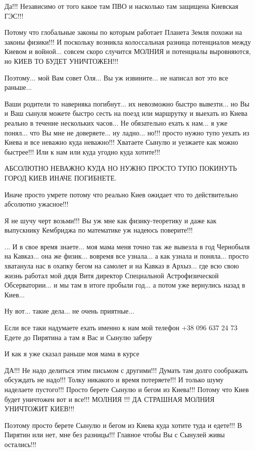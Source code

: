 Да!!! Независимо от того какое там ПВО и насколько там защищена Киевская ГЭС!!!

Потому что глобальные законы по которым работает Планета Земля похожи на законы физики!!!
И поскольку возникла колоссальная разница потенциалов между Киевом и войной... совсем скоро
случится МОЛНИЯ и потенциалы выровняются, но КИЕВ ТО БУДЕТ УНИЧТОЖЕН!!!

Поэтому... мой Вам совет Оля... Вы уж извините... не написал вот это все раньше...

Ваши родители то наверняка погибнут... их невозможно быстро вывезти... но Вы и Ваш сынуля
можете быстро сесть на поезд или маршрутку и выехать из Киева реально в течение нескольких часов...
Не обязательно ехать к нам... я уже понял... что Вы мне не доверяете... ну ладно...
но!!! просто нужно тупо уехать из Киева и все неважно куда неважно!!! Хватаете Сынулю и уезжаете как можно быстрее!!! 
Или к нам или куда угодно куда хотите!!!

АБСОЛЮТНО НЕВАЖНО КУДА НО НУЖНО ПРОСТО ТУПО ПОКИНУТЬ ГОРОД КИЕВ ИНАЧЕ ПОГИБНЕТЕ.

Иначе просто умрете потому что реально Киев ожидает что то действительно абсолютно ужасное!!! 

Я не шучу черт возьми!!! Вы уж мне как физику-теоретику и даже как выпускнику
Кембриджа по математике уж надеюсь поверите!!!

... И в свое время знаете... моя мама меня точно так же вывезла в год Чернобыля
на Кавказ... она же физик... вовремя все узнала... а как узнала и поняла... просто хватанула
нас в охапку бегом на самолет и на Кавказ в Архыз... где всю свою жизнь работал мой дядя Витя
директор Специальной Астрофизической Обсерватории... и мы там в итоге пробыли год... а потом уже 
вернулись назад в Киев...

Ну вот... такие дела... не очень приятные...

Если все таки надумаете ехать именно к нам мой телефон +38 096 637 24 73
Едете до Пирятина а там я Вас и Сынулю заберу

И как я уже сказал раньше моя мама в курсе 

ДА!!! Не надо делиться этим письмом с другими!!! Думать там долго соображать обсуждать не надо!!! 
Толку никакого и время потеряете!!!
И только шуму наделаете пустого!!! Просто берете Сынулю и бегом из Киева!!! 
Потому что Киев будет уничтожен вот и все!!!
МОЛНИЯ !!! ДА СТРАШНАЯ МОЛНИЯ УНИЧТОЖИТ КИЕВ!!!

Поэтому просто берете Сынулю и бегом из Киева куда хотите туда и едете!!! 
В Пирятин или нет, мне без разницы!!! Главное чтобы Вы с Сынулей живы остались!!!

